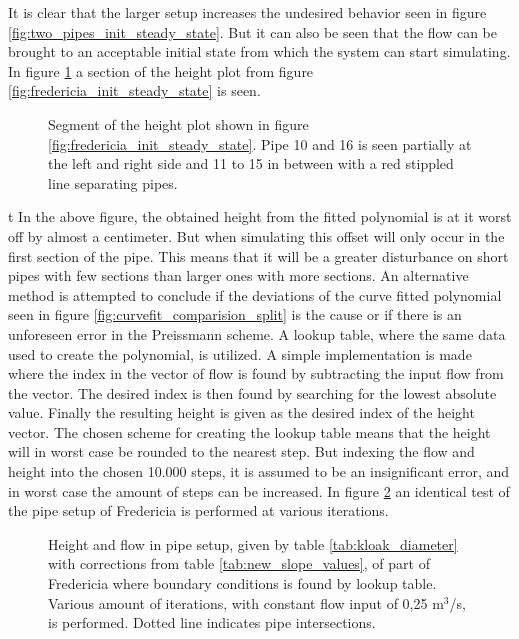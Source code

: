 It is clear that the larger setup increases the undesired behavior seen in figure \ref{fig:two_pipes_init_steady_state}. But it can also be seen that the flow can be brought to an acceptable initial state from which the system can start simulating. In figure \ref{fig:fredericia_init_steady_state_zoom} a section of the height plot from figure \ref{fig:fredericia_init_steady_state} is seen. 

\begin{figure}[H]
 \centering
 
\caption{Segment of the height plot shown in figure \ref{fig:fredericia_init_steady_state}. Pipe 10 and 16 is seen partially at the left and right side and 11 to 15 in between with a red stippled line separating pipes.}
\label{fig:fredericia_init_steady_state_zoom}
\end{figure}t
In the above figure, the obtained height from the fitted polynomial is at it worst off by almost a centimeter. But when simulating this offset will only occur in the first section of the pipe. This means that it will be a greater disturbance on short pipes with few sections than larger ones with more sections. An alternative method is attempted to conclude if the deviations of the curve fitted polynomial seen in figure \ref{fig:curvefit_comparision_split} is the cause or if there is an unforeseen error in the Preissmann scheme. A lookup table, where the same data used to create the polynomial, is utilized. A simple implementation is made where the index in the vector of flow is found by subtracting the input flow from the vector. The desired index is then found by searching for the lowest absolute value. Finally the resulting height is given as the desired index of the height vector. The chosen scheme for creating the lookup table means that the height will in worst case be rounded to the nearest step. But indexing the flow and height into the chosen 10.000 steps, it is assumed to be an insignificant error, and in worst case the amount of steps can be increased. In figure \ref{fig:fredericia_init_steady_state_lut} an identical test of the pipe setup of Fredericia is performed at various iterations.      

\begin{figure}[H]
 \centering
 
\caption{Height and flow in pipe setup, given by table \ref{tab:kloak_diameter} with corrections from table \ref{tab:new_slope_values}, of part of Fredericia where boundary conditions is found by lookup table. Various amount of iterations, with constant flow input of 0,25 $\text{m}^\text{3}$/s, is performed. Dotted line indicates pipe intersections.}
\label{fig:fredericia_init_steady_state_lut}
\end{figure}

